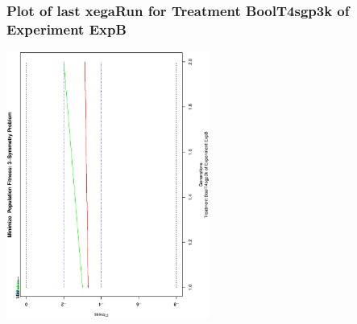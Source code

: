  \begin{frame}
 \frametitle{ Plot of last xegaRun for Treatment BoolT4sgp3k of Experiment ExpB }
 \begin{center}
\includegraphics[width=0.5\textwidth, angle=-90]
{ExpBPlotPopStatsFigure021.eps}
 \end{center}
 \label{report/ExpBPlotPopStatsFigure021.eps}  
 \end{frame}

